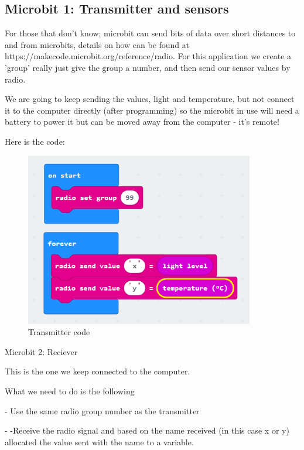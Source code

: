  
\subsection{Microbit 1: Transmitter and sensors}
For those that don’t know; microbit can send bits of data over short distances to and from microbits, details on how can be found at https://makecode.microbit.org/reference/radio. For this application we create a 'group' really just give the group a number, and then send our sensor values by radio.

We are going to keep sending the values, light and temperature, but not connect it to the computer directly (after programming) so the microbit in use will need a battery to power it but can be moved away from the computer - it's remote!

 

Here is the code:
\begin{figure}
    \centering
    \includegraphics[width=10cm]{chapters/ChapterP2-datalog/figures/datalog10.png}
    \caption{Transmitter code}
    \label{fig:datalogtransmitter}
\end{figure}





 

 

Microbit 2: Reciever

This is the one we keep connected to the computer.

What we need to do is the following

-            Use the same radio group number as the transmitter

-            -Receive the radio signal and based on the name received (in this case x or y) allocated the value sent with the name to a variable.

